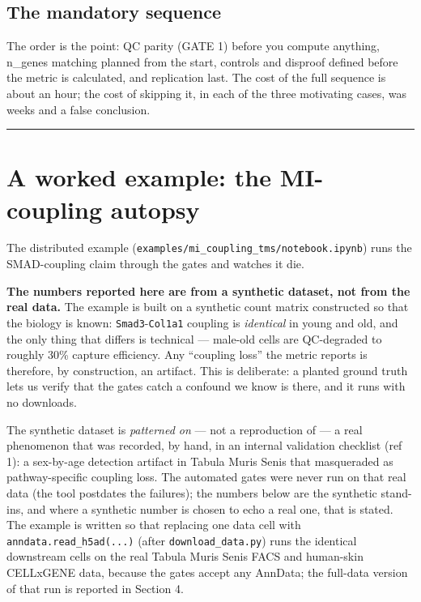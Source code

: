 \documentclass[
  11pt,
]{article}
\begin{document}
\subsection{The mandatory sequence}\label{the-mandatory-sequence}

The order is the point: QC parity (GATE 1) before you compute anything,
n\_genes matching planned from the start, controls and disproof defined
before the metric is calculated, and replication last. The cost of the
full sequence is about an hour; the cost of skipping it, in each of the
three motivating cases, was weeks and a false conclusion.

\begin{center}\rule{0.5\linewidth}{0.5pt}\end{center}

\section{A worked example: the MI-coupling
autopsy}\label{a-worked-example-the-mi-coupling-autopsy}

The distributed example
(\texttt{examples/mi\_coupling\_tms/notebook.ipynb}) runs the
SMAD-coupling claim through the gates and watches it die.

\textbf{The numbers reported here are from a synthetic dataset, not from
the real data.} The example is built on a synthetic count matrix
constructed so that the biology is known: \texttt{Smad3}-\texttt{Col1a1}
coupling is \emph{identical} in young and old, and the only thing that
differs is technical --- male-old cells are QC-degraded to roughly 30\%
capture efficiency. Any ``coupling loss'' the metric reports is
therefore, by construction, an artifact. This is deliberate: a planted
ground truth lets us verify that the gates catch a confound we know is
there, and it runs with no downloads.

The synthetic dataset is \emph{patterned on} --- not a reproduction of
--- a real phenomenon that was recorded, by hand, in an internal
validation checklist (ref 1): a sex-by-age detection artifact in Tabula
Muris Senis that masqueraded as pathway-specific coupling loss. The
automated gates were never run on that real data (the tool postdates the
failures); the numbers below are the synthetic stand-ins, and where a
synthetic number is chosen to echo a real one, that is stated. The
example is written so that replacing one data cell with
\texttt{anndata.read\_h5ad(...)} (after \texttt{download\_data.py}) runs
the identical downstream cells on the real Tabula Muris Senis FACS and
human-skin CELLxGENE data, because the gates accept any AnnData; the
full-data version of that run is reported in Section 4.
\end{document}
